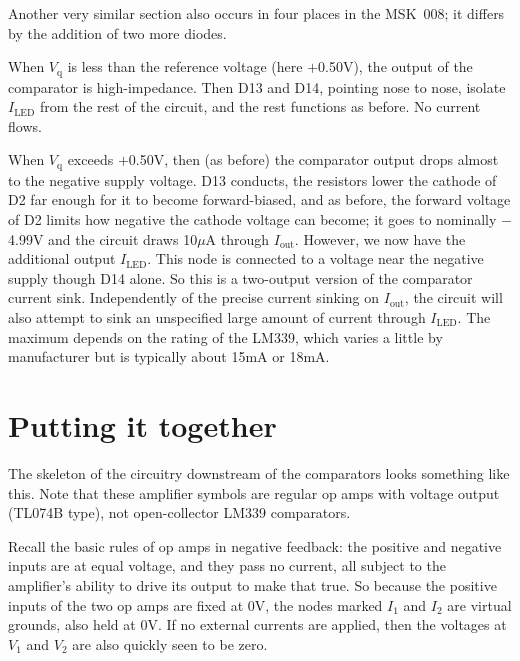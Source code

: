 Another very similar section also occurs in four places in
the MSK~008; it differs by the addition of two more diodes.

{\centering\small\par}

When $V_\textrm{q}$ is less than the reference voltage (here $+$0.50V), the
output of the comparator is high-impedance.  Then D13 and D14, pointing nose
to nose, isolate $I_\textrm{LED}$ from the rest of the circuit, and the
rest functions as before.  No current flows.

When $V_\textrm{q}$ exceeds $+$0.50V, then (as before) the comparator output
drops almost to the negative supply voltage.  D13 conducts, the resistors
lower the cathode of D2 far enough for it to become forward-biased, and as
before, the forward voltage of D2 limits how negative the cathode voltage
can become; it goes to nominally $-$4.99V and the circuit draws 10$\mu$A
through $I_\textrm{out}$.  However, we now have the additional output
$I_\textrm{LED}$.  This node is connected to a voltage near the
negative supply though D14 alone.  So this is a two-output version of the
comparator current sink.  Independently of the precise current
sinking on $I_\textrm{out}$, the circuit will also attempt to sink an
unspecified large amount of current through $I_\textrm{LED}$.  The maximum
depends on the rating of the LM339, which varies a little by
manufacturer but is typically about 15mA or 18mA.

\section{Putting it together}

The skeleton of the circuitry downstream of the comparators looks something
like this.  Note that these amplifier symbols are regular op amps with
voltage output (TL074B type), not open-collector LM339 comparators.

{\centering\small\par}

Recall the basic rules of op amps in negative feedback:  the positive and
negative inputs are at equal voltage, and they pass no current, all subject
to the amplifier's ability to drive its output to make that true.  So
because the positive inputs of the two op amps are fixed at 0V, the nodes
marked $I_1$ and $I_2$ are virtual grounds, also held at 0V.  If no external
currents are applied, then the voltages at $V_1$ and $V_2$ are also quickly
seen to be zero.

